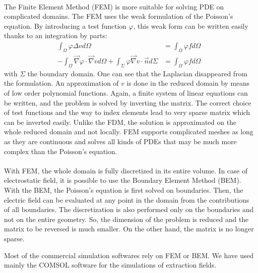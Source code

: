 \begin{refsection}
  \paragraph{}
  The Finite Element Method (FEM) is more suitable for solving PDE on complicated domains. The FEM uses the weak formulation of the Poisson’s equation. By introducing a test function $\varphi$, this weak form can be written easily thanks to an integration by parts:
  \begin{align}
    \int_{\Omega}^{} \varphi \Delta v d\Omega                                                                                           & = \int_{\Omega}^{} \varphi f d\Omega \\
    -\int_{\Omega}^{} \vec{\nabla} \varphi \cdot \vec{\nabla} v d\Omega + \int_{\Sigma}^{} \varphi \vec{\nabla} v \cdot \vec{n} d\Sigma & = \int_{\Omega}^{} \varphi f d\Omega
  \end{align}
  with $\Sigma$ the boundary domain.
  One can see that the Laplacian disappeared from the formulation. An approximation of $v$ is done in the reduced domain by means of low order polynomial functions. Again, a finite system of linear equations can be written, and the problem is solved by inverting the matrix. The correct choice of test functions and the way to index elements lead to very sparse matrix which can be inverted easily. Unlike the FDM, the solution is approximated on the whole reduced domain and not locally. FEM supports complicated meshes as long as they are continuous and solves all kinds of PDEs that may be much more complex than the Poisson’s equation.

  \paragraph{}
  With FEM, the whole domain is fully discretized in its entire volume. In case of electrostatic field, it is possible to use the Boundary Element Method (BEM). With the BEM, the Poisson’s equation is first solved on boundaries. Then, the electric field can be evaluated at any point in the domain from the contributions of all boundaries. The discretization is also performed only on the boundaries and not on the entire geometry. So, the dimension of the problem is reduced and the matrix to be reversed is much smaller. On the other hand, the matrix is no longer sparse.

  Most of the commercial simulation softwares \cite{cststudio2018,ansys2018,couloumb2018} rely on FEM or BEM. We have used mainly the COMSOL software for the simulations of extraction fields.


\end{refsection}
